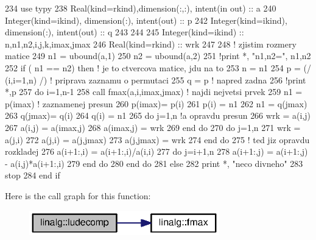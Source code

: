 \begin{DoxyCode}
234     \textcolor{keywordtype}{use }typy
238     \textcolor{keywordtype}{Real(kind=rkind)},\textcolor{keywordtype}{dimension(:,:)}, \textcolor{keywordtype}{intent(in out)} :: a
240     \textcolor{keywordtype}{Integer(kind=ikind)}, \textcolor{keywordtype}{dimension(:)}, \textcolor{keywordtype}{intent(out)}  :: p
242     \textcolor{keywordtype}{Integer(kind=ikind)}, \textcolor{keywordtype}{dimension(:)}, \textcolor{keywordtype}{intent(out)}  :: q
243     
244     
245     \textcolor{keywordtype}{Integer(kind=ikind)}  :: n,n1,n2,i,j,k,imax,jmax
246     \textcolor{keywordtype}{Real(kind=rkind)} :: wrk
247 
248     \textcolor{comment}{! zjistim rozmery matice
}
249     n1 = ubound(a,1)
250     n2 = ubound(a,2)
251     \textcolor{comment}{!print *, "n1,n2=", n1,n2
}
252     \textcolor{keywordflow}{if} ( n1 == n2) \textcolor{keywordflow}{then} \textcolor{comment}{! je to ctvercova matice, jdu na to
}
253       n = n1
254       p = (/ (i,i=1,n) /) \textcolor{comment}{! priprava zaznamu o permutaci
}
255       q = p               \textcolor{comment}{! napred zadna
}
256       \textcolor{comment}{!print *,p
}
257       \textcolor{keywordflow}{do} i=1,n-1
258         \textcolor{keyword}{call }fmax(a,i,imax,jmax) \textcolor{comment}{! najdi nejvetsi prvek
}
259         n1     = p(imax)         \textcolor{comment}{! zaznamenej presun
}
260         p(imax)= p(i)
261         p(i)   = n1
262         n1     = q(jmax)
263         q(jmax)= q(i)
264         q(i)   = n1
265         \textcolor{keywordflow}{do} j=1,n                 \textcolor{comment}{!a opravdu presun
}
266           wrk       = a(i,j)
267           a(i,j)    = a(imax,j)
268           a(imax,j) = wrk 
269 \textcolor{keyword}{        end }do
270         \textcolor{keywordflow}{do} j=1,n
271           wrk       = a(j,i)
272           a(j,i)    = a(j,jmax)
273           a(j,jmax) = wrk 
274 \textcolor{keyword}{        end }do
275         \textcolor{comment}{! ted jiz opravdu rozkladej
}
276         a(i+1:,i) = a(i+1:,i)/a(i,i)
277         \textcolor{keywordflow}{do} j=i+1,n
278           a(i+1:,j) = a(i+1:,j) - a(i,j)*a(i+1:,i)
279 \textcolor{keyword}{        end }do
280 \textcolor{keyword}{      end }do
281     else
282       print *, \textcolor{stringliteral}{"neco divneho"}
283       stop  
284 \textcolor{keyword}{    end }if
\end{DoxyCode}


Here is the call graph for this function\+:\nopagebreak
\begin{figure}[H]
\begin{center}
\leavevmode
\includegraphics[width=234pt]{namespacelinalg_a9107da1d2e606f47e335aaab8f14823e_cgraph}
\end{center}
\end{figure}


